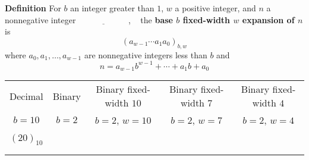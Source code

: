 
{\bf Definition} For $b$ an integer greater than $1$, $w$ a positive integer, 
and $n$ a nonnegative integer
$\underline{\phantom{\hspace{1in}}}$, ~
the {\bf base $b$ fixed-width $w$ expansion of $n$}  is
\[
(a_{w-1} \cdots a_1 a_0)_{b,w}
\]
where  $a_0, a_1, \ldots, a_{w-1}$ are nonnegative integers less than $b$ and
\[
n =  a_{w-1} b^{w-1} + \cdots + a_1b + a_0
\]

\begin{center}
\begin{tabular}{|c|c|c|c|c|}
\hline
Decimal &  Binary  & Binary fixed-width $10$& Binary fixed-width $7$ & Binary fixed-width $4$\\
$b=10$ & $b=2$ & $b=2$, $w =  10$& $b=2$, $w =  7$& $b=2$, $w =  4$ \\
\hline 
&&&&  \\
$(20)_{10}$&\phantom{$(10100)_{2}$\qquad\qquad}&&  &\\
&&&&  \\
&&&&  \\
\hline
\end{tabular}
\end{center}
